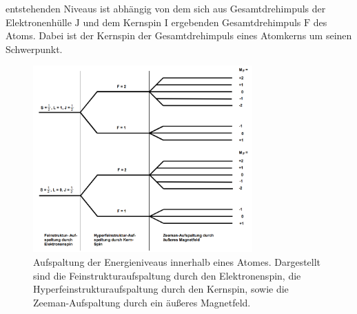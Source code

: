 \documentclass[
  bibliography=totoc,     %
  captions=tableheading,  %
  titlepage=firstiscover, %
]{scrartcl}
\begin{document}
entstehenden Niveaus ist abhängig von dem sich aus Gesamtdrehimpuls der
Elektronenhülle $\mathup{J}$ und dem Kernspin $\mathup{I}$ ergebenden
Gesamtdrehimpuls $\mathup{F}$ des Atoms. Dabei ist der Kernspin der
Gesamtdrehimpuls eines Atomkerns um seinen Schwerpunkt.
%
\begin{figure}[h]
  \centering
  \includegraphics[width=0.75\textwidth]{Aufspaltung.jpg}
  \caption{Aufspaltung der Energieniveaus innerhalb eines Atomes. Dargestellt
  sind die Feinstrukturaufspaltung durch den Elektronenspin, die
  Hyperfeinstrukturaufspaltung durch den Kernspin, sowie die Zeeman-Aufspaltung
  durch ein äußeres Magnetfeld. \cite{anleitung}}
  \label{fig:aufspaltung}
\end{figure}
\end{document}
